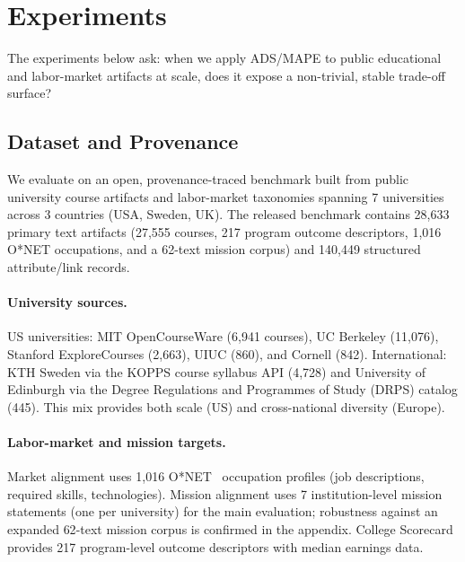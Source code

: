 \documentclass[sigconf,review]{acmart}
\newcommand{\NumCourses}{27,555}             %
\newcommand{\NumOccupations}{1,016}          %
\newcommand{\NumScorecardPrograms}{217}      %
\newcommand{\NumAttributeRecords}{140,449}   %
\newcommand{\NumPrograms}{217}               %
\newcommand{\NumPrimaryArtifacts}{28,633}    %
\newcommand{\NumMissionsMain}{7}             %
\newcommand{\NumMissionsExpanded}{62}        %
\newcommand{\NumUniversities}{7}
\newcommand{\NumCountries}{3}                %
\newcommand{\NumMIT}{6,941}                  %
\newcommand{\NumUCB}{11,076}                 %
\newcommand{\NumStanford}{2,663}             %
\newcommand{\NumUIUC}{860}                   %
\newcommand{\NumCornell}{842}                %
\newcommand{\NumKTH}{4,728}                  %
\newcommand{\NumEdinburgh}{445}              %
\newcommand{\ADS}{\textsc{ADS}\xspace}
\newcommand{\MAPE}{\textsc{MAPE}\xspace}
\begin{document}
\section{Experiments}
\label{sec:experiments}

The experiments below ask: when we apply \ADS/\MAPE to public educational and labor-market artifacts at scale, does it expose a non-trivial, stable trade-off surface?

\subsection{Dataset and Provenance}
\label{subsec:data}

We evaluate on an open, provenance-traced benchmark built from public university course artifacts and labor-market taxonomies spanning {\NumUniversities} universities across {\NumCountries} countries (USA, Sweden, UK). The released benchmark contains {\NumPrimaryArtifacts} primary text artifacts ({\NumCourses} courses, {\NumPrograms} program outcome descriptors, {\NumOccupations} O*NET occupations, and a {\NumMissionsExpanded}-text mission corpus) and {\NumAttributeRecords} structured attribute/link records.

\paragraph{University sources.}
US universities: MIT OpenCourseWare ({\NumMIT} courses), UC Berkeley ({\NumUCB}), Stanford ExploreCourses ({\NumStanford}), UIUC ({\NumUIUC}), and Cornell ({\NumCornell}). International: KTH Sweden via the KOPPS course syllabus API ({\NumKTH}) and University of Edinburgh via the Degree Regulations and Programmes of Study (DRPS) catalog ({\NumEdinburgh}). This mix provides both scale (US) and cross-national diversity (Europe).

\paragraph{Labor-market and mission targets.}
Market alignment uses {\NumOccupations} O*NET~\cite{onet2025} occupation profiles (job descriptions, required skills, technologies). Mission alignment uses {\NumMissionsMain} institution-level mission statements (one per university) for the main evaluation; robustness against an expanded {\NumMissionsExpanded}-text mission corpus is confirmed in the appendix. College Scorecard provides {\NumScorecardPrograms} program-level outcome descriptors with median earnings data.
\end{document}
